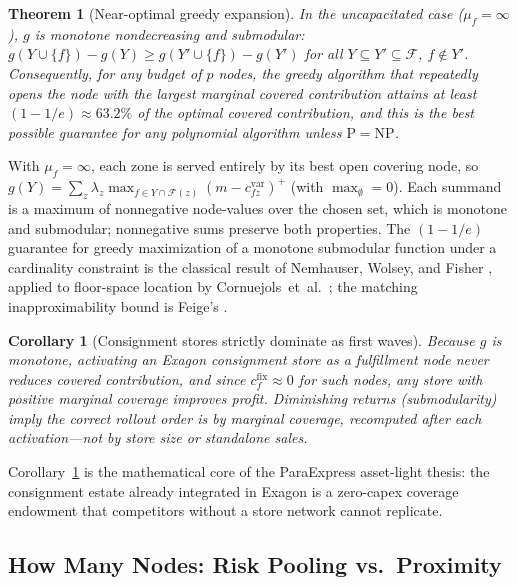 \documentclass[journal]{IEEEtran}
\newtheorem{theorem}{Theorem}
\newtheorem{corollary}{Corollary}
\begin{document}
\begin{theorem}[Near-optimal greedy expansion]
\label{thm:submodular}
In the uncapacitated case ($\mu_f = \infty$), $g$ is monotone nondecreasing and submodular:
$g(Y \cup \{f\}) - g(Y) \ge g(Y' \cup \{f\}) - g(Y')$ for all $Y \subseteq Y' \subseteq \mathcal{F}$, $f \notin Y'$.
Consequently, for any budget of $p$ nodes, the greedy algorithm that repeatedly opens the node with the largest marginal covered contribution attains at least $(1 - 1/e) \approx 63.2\%$ of the optimal covered contribution, and this is the best possible guarantee for any polynomial algorithm unless $\mathrm{P}=\mathrm{NP}$.
\end{theorem}
\begin{IEEEproof}
With $\mu_f = \infty$, each zone is served entirely by its best open covering node, so
$g(Y) = \sum_z \lambda_z \max_{f \in Y \cap \mathcal{F}(z)} (m - c^{\mathrm{var}}_{fz})^+$ (with $\max_\emptyset = 0$). Each summand is a maximum of nonnegative node-values over the chosen set, which is monotone and submodular; nonnegative sums preserve both properties. The $(1-1/e)$ guarantee for greedy maximization of a monotone submodular function under a cardinality constraint is the classical result of Nemhauser, Wolsey, and Fisher \cite{nemhauser}, applied to floor-space location by Cornuejols~et~al.~\cite{cornuejols}; the matching inapproximability bound is Feige's \cite{feige}.
\end{IEEEproof}

\begin{corollary}[Consignment stores strictly dominate as first waves]
\label{cor:stores}
Because $g$ is monotone, activating an Exagon consignment store as a fulfillment node never reduces covered contribution, and since $c^{\mathrm{fix}}_f \approx 0$ for such nodes, any store with positive marginal coverage improves profit. Diminishing returns (submodularity) imply the correct rollout order is by \emph{marginal} coverage, recomputed after each activation---not by store size or standalone sales.
\end{corollary}

Corollary~\ref{cor:stores} is the mathematical core of the ParaExpress asset-light thesis: the consignment estate already integrated in Exagon is a zero-capex coverage endowment that competitors without a store network cannot replicate.

\subsection{How Many Nodes: Risk Pooling vs.\ Proximity}
\end{document}
